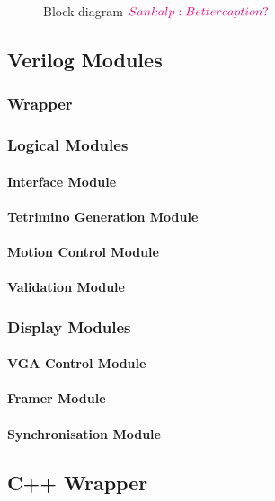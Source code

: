 
\begin{figure}
    \centering
    
    \caption{Block diagram $\sankalp{Better caption?}$}
\label{fig:blockdiag}
\end{figure}

\subsection{Verilog Modules}

\subsubsection{Wrapper}


\subsubsection{Logical Modules}

\paragraph{Interface Module}
\paragraph{Tetrimino Generation Module}
\paragraph{Motion Control Module}
\paragraph{Validation Module}

\subsubsection{Display Modules}

\paragraph{VGA Control Module}
\paragraph{Framer Module}
\paragraph{Synchronisation Module}


\subsection{C++ Wrapper}
